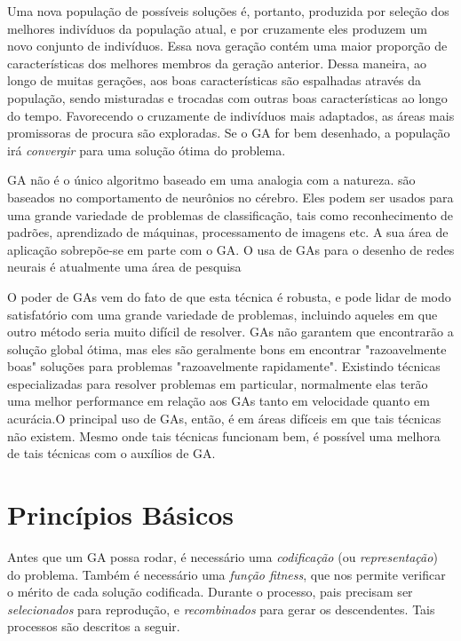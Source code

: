 Uma nova população de possíveis soluções é, portanto, produzida por seleção dos melhores indivíduos da população atual, e por cruzamente eles produzem um novo conjunto de indivíduos. Essa nova geração contém uma maior proporção de características dos melhores membros da geração anterior. Dessa maneira, ao longo de muitas gerações, aos boas características são espalhadas através da população, sendo misturadas e trocadas com outras boas características ao longo do tempo. Favorecendo o cruzamente de indivíduos mais adaptados, as áreas mais promissoras de procura são exploradas. Se o GA for bem desenhado, a população irá \textit{convergir} para uma solução ótima do problema.

GA não é o único algoritmo baseado em uma analogia com a natureza.  são baseados no comportamento de neurônios no cérebro. Eles podem ser usados para uma grande variedade de problemas de classificação, tais como reconhecimento de padrões, aprendizado de máquinas, processamento de imagens etc. A sua área de aplicação sobrepõe-se em parte com o GA. O usa de GAs para o desenho de redes neurais é atualmente uma área de pesquisa \cite{Harp1991}

O poder de GAs vem do fato de que esta técnica é robusta, e pode lidar de modo satisfatório com uma grande variedade de problemas, incluindo aqueles em que outro método seria muito difícil de resolver. GAs não garantem que encontrarão a solução global ótima, mas eles são geralmente bons em encontrar "razoavelmente boas" soluções para problemas "razoavelmente rapidamente". Existindo técnicas especializadas para resolver problemas em particular, normalmente elas terão uma melhor performance em relação aos GAs tanto em velocidade quanto em acurácia.O principal uso de GAs, então, é em áreas difíceis em que tais técnicas não existem. Mesmo onde tais técnicas funcionam bem, é possível uma melhora de tais técnicas com o auxílios de GA.

\section{Princípios Básicos}
Antes que um GA possa rodar, é necessário uma \textit{codificação} (ou \textit{representação}) do problema. Também é necessário uma \textit{função fitness}, que nos permite verificar o mérito de cada solução codificada. Durante o processo, pais precisam ser \textit{selecionados} para reprodução, e \textit{recombinados} para gerar os descendentes. Tais processos são descritos a seguir.

